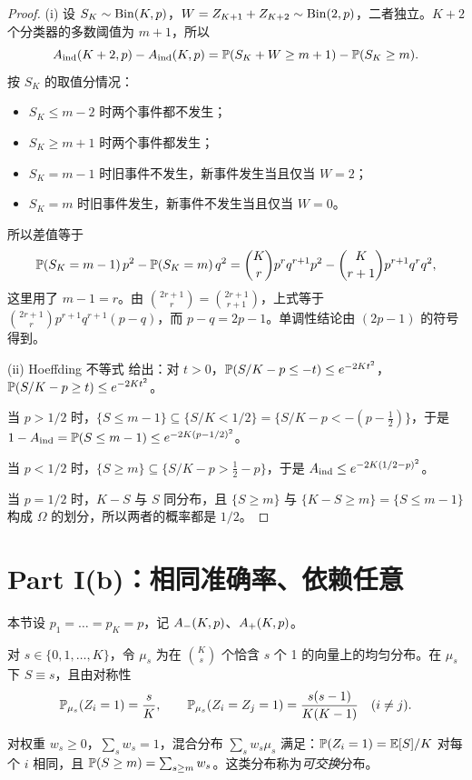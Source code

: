\documentclass[11pt]{article}
\begin{document}
\begin{proof}
(i) 设 $S_K\sim\operatorname{Bin}(K,p)$，$W=Z_{K+1}+Z_{K+2}\sim\operatorname{Bin}(2,p)$，二者独立。$K+2$ 个分类器的多数阈值为 $m+1$，所以
\[
A_{\mathrm{ind}}(K+2,p)-A_{\mathrm{ind}}(K,p)=\mathbb{P}(S_K+W\ge m+1)-\mathbb{P}(S_K\ge m).
\]
按 $S_K$ 的取值分情况：
\begin{itemize}
\item $S_K\le m-2$ 时两个事件都不发生；
\item $S_K\ge m+1$ 时两个事件都发生；
\item $S_K=m-1$ 时旧事件不发生，新事件发生当且仅当 $W=2$；
\item $S_K=m$ 时旧事件发生，新事件不发生当且仅当 $W=0$。
\end{itemize}
所以差值等于
\[
\mathbb{P}(S_K=m-1)\,p^2-\mathbb{P}(S_K=m)\,q^2
=\binom{K}{r}p^{r}q^{r+1}p^2-\binom{K}{r+1}p^{r+1}q^{r}q^2,
\]
这里用了 $m-1=r$。由 $\binom{2r+1}{r}=\binom{2r+1}{r+1}$，上式等于 $\binom{2r+1}{r}p^{r+1}q^{r+1}(p-q)$，而 $p-q=2p-1$。单调性结论由 $(2p-1)$ 的符号得到。

(ii) Hoeffding 不等式 \cite{hoeffding} 给出：对 $t>0$，$\mathbb{P}(S/K-p\le -t)\le e^{-2Kt^2}$，$\mathbb{P}(S/K-p\ge t)\le e^{-2Kt^2}$。

当 $p>1/2$ 时，$\{S\le m-1\}\subseteq\{S/K<1/2\}=\{S/K-p<-(p-\tfrac12)\}$，于是 $1-A_{\mathrm{ind}}=\mathbb{P}(S\le m-1)\le e^{-2K(p-1/2)^2}$。

当 $p<1/2$ 时，$\{S\ge m\}\subseteq\{S/K-p>\tfrac12-p\}$，于是 $A_{\mathrm{ind}}\le e^{-2K(1/2-p)^2}$。

当 $p=1/2$ 时，$K-S$ 与 $S$ 同分布，且 $\{S\ge m\}$ 与 $\{K-S\ge m\}=\{S\le m-1\}$ 构成 $\Omega$ 的划分，所以两者的概率都是 $1/2$。
\end{proof}

\section{Part I(b)：相同准确率、依赖任意}

本节设 $p_1=\dots=p_K=p$，记 $A_{-}(K,p)$、$A_{+}(K,p)$。

\begin{definition}[均匀 $s$-子集分布]\label{def:mus}
对 $s\in\{0,1,\dots,K\}$，令 $\mu_s$ 为在 $\binom{K}{s}$ 个恰含 $s$ 个 1 的向量上的均匀分布。在 $\mu_s$ 下 $S\equiv s$，且由对称性
\[
\mathbb{P}_{\mu_s}(Z_i=1)=\frac{s}{K},\qquad \mathbb{P}_{\mu_s}(Z_i=Z_j=1)=\frac{s(s-1)}{K(K-1)}\quad(i\ne j).
\]
\end{definition}
对权重 $w_s\ge0$，$\sum_s w_s=1$，混合分布 $\sum_s w_s\mu_s$ 满足：$\mathbb{P}(Z_i=1)=\mathbb{E}[S]/K$ 对每个 $i$ 相同，且 $\mathbb{P}(S\ge m)=\sum_{s\ge m}w_s$。这类分布称为\emph{可交换}分布。
\end{document}
